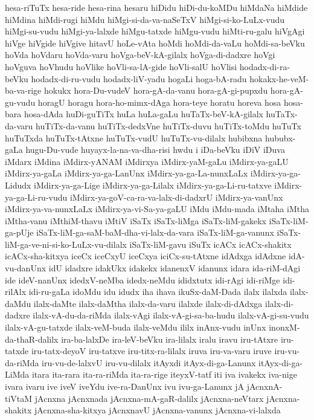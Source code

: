 {hesa-riTuTx
hesa-ride
hesa-rina
hesaru
hiDidu
hiDi-du-koMDu
hiMdaNa
hiMdide
hiMdina
hiMdi-rugi
hiMdu
hiMgi-si-da-va-naSeTxV
hiMgi-si-ko-LuLx-vudu
hiMgi-su-vudu
hiMgi-ya-lalxde
hiMgu-tatxde
hiMgu-vudu
hiMti-ru-galu
hiVgAgi
hiVge
hiVgide
hiVgive
hitavU
hoLe-vAta
hoMdi
hoMdi-da-vaLu
hoMdi-sa-beVku
hoVda
hoVdaru
hoVda-varu
hoVga-beV-kA-gilalx
hoVga-di-dadxre
hoVgi
hoVguva
hoVhudu
hoVlike
hoVli-sa-lA-gide
hoVli-salU
hoVlisi
hodadx-di-ra-beVku
hodadx-di-ru-vudu
hodadx-liV-yadu
hogaLi
hoga-bA-radu
hokakx-he-veM-ba-va-rige
hokukx
hora-Du-vudeV
hora-gA-da-vanu
hora-gA-gi-pupxdu
hora-gA-gu-vudu
horagU
horagu
hora-ho-mimx-dAga
hora-teye
horatu
horeva
hosa
hosa-bara
hosa-dAda
huDi-guTiTx
huLa
huLa-gaLu
huTaTx-beV-kA-gilalx
huTaTx-da-varu
huTiTx-da-vanu
huTiTx-dedxVne
huTiTx-duvu
huTiTx-toMdu
huTuTx
huTuTxda
huTuTx-tAtxne
huTuTx-vudU
huTuTx-vu-dilalx
hubibxna
hububx-gaLa
hugu-Du-vude
huyayx-la-na-va-dha-risi
hwdu
i
iDa-beVku
iDiV
iDuva
iMdarx
iMdina
iMdirx-yANAM
iMdirxya
iMdirx-yaM-gaLu
iMdirx-ya-gaLU
iMdirx-ya-gaLa
iMdirx-ya-ga-LanUnx
iMdirx-ya-ga-La-nunxLaLx
iMdirx-ya-ga-Lidudx
iMdirx-ya-ga-Lige
iMdirx-ya-ga-Lilalx
iMdirx-ya-ga-Li-ru-tatxve
iMdirx-ya-ga-Li-ru-vudu
iMdirx-ya-goV-ca-ra-va-lalx-di-dadxrU
iMdirx-ya-vanUnx
iMdirx-ya-va-nunxLaLx
iMdirx-ya-vi-Sa-ya-gaLU
iMdu
iMdu-mada
iMtaha
iMtha
iMtha-vanu
iMthiM-thavu
iMtiV
iSaTx
iSaTx-liMga
iSaTx-liM-gakekx
iSaTx-liM-ga-pUje
iSaTx-liM-ga-saM-baM-dha-vi-lalx-da-vara
iSaTx-liM-ga-vanunx
iSaTx-liM-ga-ve-ni-si-ko-LuLx-vu-dilalx
iSaTx-liM-gavu
iSuTx
icACx
icACx-shakitx
icACx-sha-kitxya
iceCx
iceCxyU
iceCxya
iciCx-su-tAtxne
idAdxga
idAdxne
idA-vu-danUnx
idU
idadxre
idakUkx
idakekx
idanenxV
idanunx
idara
ida-riM-dAgi
ide
ideV-nanUnx
idedxV-neMba
idedx-neMdu
ididxtutx
idi-rAgi
idi-riMge
idi-rilAlx
idi-ru-gaLa
idoMdu
idu
idudx
iha
ihava
ikuSx-daM-Dada
ilalx
ilalxda
ilalx-daMdu
ilalx-daMte
ilalx-daMtha
ilalx-da-varu
ilalxde
ilalx-di-dAdxga
ilalx-di-dadxre
ilalx-vA-du-da-riMda
ilalx-vAgi
ilalx-vA-gi-sa-ba-hudu
ilalx-vA-gi-su-vudu
ilalx-vA-gu-tatxde
ilalx-veM-buda
ilalx-veMdu
ililx
inAnx-vudu
inUnx
inonxM-da-thaR-dalilx
ira-ba-lalxDe
ira-leV-beVku
ira-lilalx
iralu
iravu
iru-tAtxre
iru-tatxde
iru-tatx-deyoV
iru-tatxve
iru-titx-ra-lilalx
iruva
iru-va-varu
iruve
iru-vu-da-riMda
iru-vu-de-lalxvU
iru-vu-dilalx
itAyxdi
itAyx-di-ga-Lanunx
itAyx-di-ga-LiMda
itara
ita-rara
ita-ra-riMda
ita-ra-rige
iteyxV-tatf
iti
iva
ivakekx
iva-nige
ivara
ivaru
ive
iveV
iveYdu
ive-ra-DanUnx
ivu
ivu-ga-Lanunx
jA
jAcnxnA-tiVtaM
jAcnxna
jAcnxnada
jAcnxna-mA-gaR-dalilx
jAcnxna-neVtarx
jAcnxna-shakitx
jAcnxna-sha-kitxya
jAcnxnavU
jAcnxna-vanunx
jAcnxna-vi-lalxda
}
